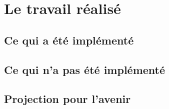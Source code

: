 \chapter{Le travail réalisé}

\section{Ce qui a été implémenté}
\section{Ce qui n'a pas été implémenté}
\section{Projection pour l'avenir}

